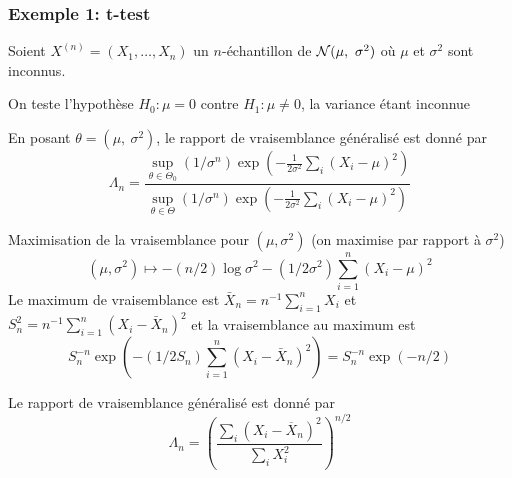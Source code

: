 \begin{frame}
\frametitle{Exemple 1: t-test}
\begin{itemize}
\item  Soient $X^{(n)}= (X_{1}, \dots, X_{n})$ un $n$-échantillon de $\mathcal{N}(\mu,\ \sigma^{2})$ où \alert{$\mu$ et $\sigma^2$ sont inconnus}.
\item On teste l'hypothèse $H_0: \mu =0$ contre $H_1: \mu \ne 0$, la variance étant inconnue
\item En posant $\theta=(\mu,\ \sigma^{2})$, le rapport de vraisemblance généralisé est donné par
\begin{equation*}
\Lambda_{n}=\frac{\sup_{\theta\in\Theta_{0}}(1/\sigma^{n})\exp(-\frac{1}{2\sigma^{2}}\sum_{i}(X_{i}-\mu)^{2})}{\sup_{\theta\in\Theta}(1/\sigma^{n})\exp(-\frac{1}{2\sigma^{2}}\sum_{i}(X_{i}-\mu)^{2})}
\end{equation*}
{
\item Maximisation de la vraisemblance pour $(\mu,\sigma^2)$ (on maximise par rapport à $\sigma^2$)
\[
(\mu,\sigma^2) \mapsto -(n/2) \log \sigma^2 -(1/2\sigma^2) \sum_{i=1}^n (X_i-\mu)^2
\]
Le maximum de vraisemblance est $\bar{X}_n= n^{-1} \sum_{i=1}^n X_i$ et $S_n^2 = n^{-1} \sum_{i=1}^n (X_i-\bar{X}_n)^2$ et la vraisemblance au maximum est
\[
S_n^{-n} \exp(- (1/2 S_n) \sum_{i=1}^n (X_i - \bar{X}_n)^2) =   S_n^{-n}  \exp(-n/2)
\]
}
{ \item Le rapport de vraisemblance généralisé est donné par
\begin{equation*}
\Lambda_{n}=\left( \frac{\sum_{i}(X_{i}-\overline{X}_{n})^{2}}{\sum_{i}X_{i}^{2}} \right)^{n/2}
\end{equation*}
} 
\end{itemize}
\end{frame}


